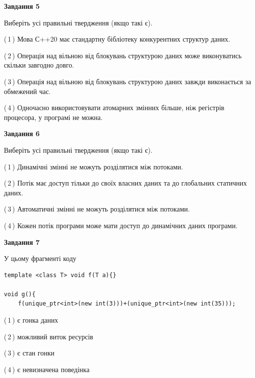 \documentclass[12pt, ukrainian]{article}
\begin{document}
\begin {large}
{\begin{center}
\textbf{Завдання 5}
\end{center}

Виберіть усі правильні твердження (якщо такі є).\par
\vspace{2mm}

(\,1\,) Мова С++20 має стандартну бібліотеку конкурентних структур даних.%

(\,2\,) Операція над вільною від блокувань структурою даних може виконуватись скільки завгодно довго.%

(\,3\,) Операція над вільною від блокувань структурою даних завжди виконається за обмежений час.%

(\,4\,) Одночасно використовувати атомарних змінних більше, ніж регістрів процесора, у програмі не можна.%
\newpage


\begin{center}
\textbf{Завдання 6}
\end{center}

Виберіть усі правильні твердження (якщо такі є).\par
\vspace{2mm}

(\,1\,) Динамічні змінні не можуть розділятися між потоками.%

(\,2\,) Потік має доступ тільки до своїх власних даних та до глобальних статичних даних.%

(\,3\,) Автоматичні змінні не можуть розділятися між потоками.%

(\,4\,) Кожен потік програми може мати доступ до динамічних даних програми.%


\begin{center}
\textbf{Завдання 7}
\end{center}

У цьому фрагменті коду
\begin{verbatim}
template <class T> void f(T a){}

void g(){
    f(unique_ptr<int>(new int(3)))+(unique_ptr<int>(new int(35)));
\end{verbatim}

(\,1\,) є гонка даних%

(\,2\,) можливий виток ресурсів%

(\,3\,) є стан гонки%

(\,4\,) є невизначена поведінка%

}
\end {large}

\vspace{4mm}
\newpage
\end{document}
